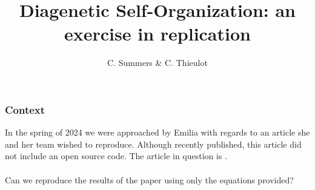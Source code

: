 \documentclass[a4paper]{article}
\title{Diagenetic Self-Organization: an exercise in replication}
\author{C. Summers \& C. Thieulot}
\begin{document}
\maketitle


\subsubsection*{Context}

In the spring of 2024 we were approached by Emilia with regards to an article she and 
her team wished to reproduce. Although recently published, this article did not include an open source code. The article in question is \cite{lheu18}.\\\\ 
Can we reproduce the results of the paper using only the equations provided?

\end{document}
